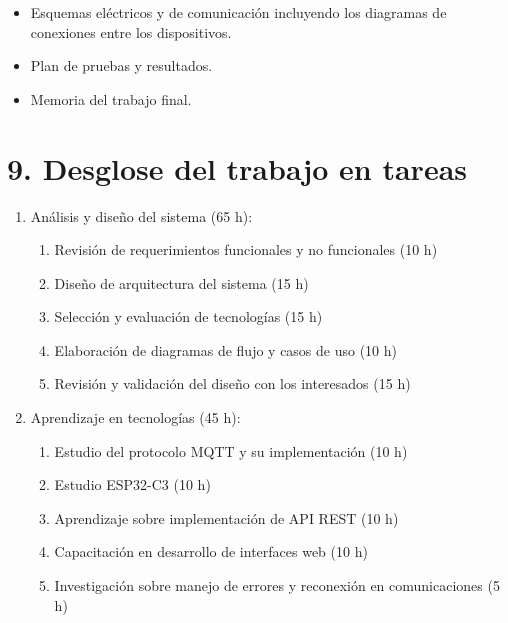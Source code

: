 \documentclass[
11pt, %
]{charter}
\begin{document}
\begin{itemize}
\item Esquemas eléctricos y de comunicación incluyendo los diagramas de conexiones entre los dispositivos.
\item Plan de pruebas y resultados.
\item Memoria del trabajo final.

\end{itemize}


\section{9. Desglose del trabajo en tareas}
\label{sec:wbs}

\begin{enumerate}
\item Análisis y diseño del sistema (65 h):
\begin{enumerate}
\item Revisión de requerimientos funcionales y no funcionales (10 h)
\item Diseño de arquitectura del sistema (15 h)
\item Selección y evaluación de tecnologías (15 h)
\item Elaboración de diagramas de flujo y casos de uso (10 h)
\item Revisión y validación del diseño con los interesados (15 h)
\end{enumerate}

\item Aprendizaje en tecnologías (45 h):
\begin{enumerate}
\item Estudio del protocolo MQTT y su implementación (10 h)
\item Estudio ESP32-C3 (10 h)
\item Aprendizaje sobre implementación de API REST (10 h)
\item Capacitación en desarrollo de interfaces web (10 h)
\item Investigación sobre manejo de errores y reconexión en comunicaciones (5 h)
\end{enumerate}


\end{enumerate}
\end{document}
